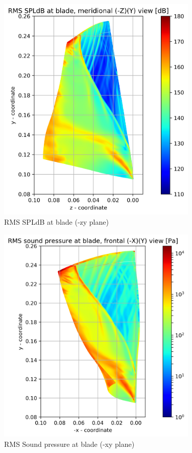 \begin{figure}[ht]
	\centering
	\includegraphics[width=0.85\textwidth]{Figures/blade-negzy-rms-spldb.png}
	\caption{RMS SPLdB at blade (-zy plane)} \label{blade-negzy-rms-spldb}
\end{figure}

\begin{figure}[ht]
	\centering
	\includegraphics[width=0.85\textwidth]{Figures/blade-negxy-rms-spl.png}
    \caption{RMS Sound pressure at blade (-xy plane)} \label{blade-negxy-rms-spl}
\end{figure}	

